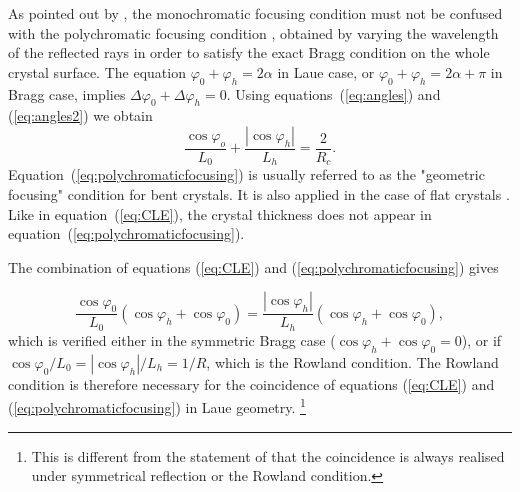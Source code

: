 \documentclass[preprint]{iucr}              %
\newcommand{\inred}[1]{{\color{red}#1}}
\begin{document}
As pointed out by \cite{CK}, the monochromatic focusing \inred{condition} must not be confused with the polychromatic focusing \inred{condition} \cite{handbook,Caciuffo1987,Schulze1998,Martinson}, obtained by varying the wavelength of the reflected rays in order to satisfy the exact Bragg condition on the \inred{whole} crystal surface.
The equation $\varphi_0+\varphi_h=2\alpha$ in Laue case\inred{, or $\varphi_0+\varphi_h=2\alpha+\pi$ in Bragg case,} implies $\Delta\varphi_0+\Delta\varphi_h=0$. Using equations~(\ref{eq:angles}) and  (\ref{eq:angles2}) we obtain
\begin{equation}
\label{eq:polychromaticfocusing}
\frac{{\cos {\varphi _o}}}{{{L_0}}} + \frac{{\left| {\cos {\varphi _h}} \right|}}{{{L_h}}} = \frac{2}{R_c}.
\end{equation}
Equation~(\ref{eq:polychromaticfocusing}) is usually referred to as the "geometric focusing" condition for bent crystals. It is also applied in the case of flat crystals \cite{sanchezdelrio1994}. \inred{Like in equation~(\ref{eq:CLE}), the crystal thickness does not appear in equation~(\ref{eq:polychromaticfocusing}).}
\inred{The combination of equations (\ref{eq:CLE}) and (\ref{eq:polychromaticfocusing}) gives

\begin{equation}
\label{eq:coincidence}
\frac{\cos\varphi_0}{L_0}(\cos\varphi_h+\cos\varphi_0) = \frac{|\cos\varphi_h|}{L_h}(\cos\varphi_h+\cos\varphi_0),
\end{equation}
which is verified either in the symmetric Bragg case ($\cos\varphi_h+\cos\varphi_0=0$), or if $\cos\varphi_0/L_0=|\cos\varphi_h|/L_h=1/R$, which is the Rowland condition. The Rowland condition is therefore necessary for the coincidence of equations (\ref{eq:CLE}) and (\ref{eq:polychromaticfocusing}) in Laue geometry.
\footnote{This is different from the statement of \cite{CK} that the coincidence is always realised under symmetrical reflection or the Rowland condition.}
}




\end{document}
